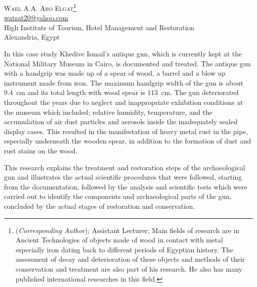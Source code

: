 \begin{center}
	{\Large\scshape 	Wael A.A. Abo Elgat\footnote{(\textit{Corresponding Author});  Assistant Lecturer; Main fields of research are in Ancient Technologies of objects made of wood in contact with metal especially iron dating back to different periods of Egyptian history. The assessment of decay and deterioration of these objects and methods of their conservation and treatment are also part of his research. He also has many published international researches in this field.}}\\
\href{mailto:watsat20@yahoo.com}{watsat20@yahoo.com}\\
High Institute of Tourism, Hotel Management and Restoration\\ Alexandria, Egypt

\end{center}
\vspace{3em}
\midarticle
\label{zidan:firstpage}

	\begin{myabstract}
 In this case study Khedive Ismail’s antique gun, which is currently kept at the National Military Museum in Cairo, is documented and treated. The antique gun with a handgrip was made up of a spear of wood, a barrel and a blow up instrument made from iron.  The maximum handgrip width of the gun is about \SI{9.4}{\centi\meter} and its total length with wood spear is \SI{113}{\centi\metre}. The gun deteriorated throughout the years due to neglect and inappropriate exhibition conditions at the museum which included; relative humidity, temperature, and the accumulation of air dust particles and aerosols inside the inadequately sealed display cases. This resulted in the manifestation of heavy metal rust in the pipe, especially underneath the wooden spear, in addition to the formation of dust and rust stains on the wood.

This research explains the treatment and restoration steps of the archaeological gun and illustrates the actual scientific procedures that were followed, starting from the documentation, followed by the analysis and scientific tests which were carried out to identify the components and archaeological parts of the gun, concluded by the actual stages of restoration and conservation.
		
	\end{myabstract}

